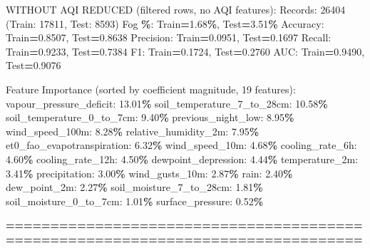\documentclass[
  letterpaper,
  DIV=11,
  numbers=noendperiod]{scrartcl}
\newenvironment{Shaded}{\begin{snugshade}}{\end{snugshade}}
\newcommand{\BuiltInTok}[1]{#1}
\newcommand{\DecValTok}[1]{\textcolor[rgb]{0.00,0.00,0.81}{#1}}
\newcommand{\FloatTok}[1]{\textcolor[rgb]{0.00,0.00,0.81}{#1}}
\newcommand{\NormalTok}[1]{#1}
\newcommand{\OperatorTok}[1]{\textcolor[rgb]{0.81,0.36,0.00}{\textbf{#1}}}
\begin{document}
\begin{Shaded}
\begin{Highlighting}[]
\NormalTok{WITHOUT AQI REDUCED (filtered rows, no AQI features):}
\NormalTok{  Records: }\DecValTok{26404}\NormalTok{ (Train: }\DecValTok{17811}\NormalTok{, Test: }\DecValTok{8593}\NormalTok{)}
\NormalTok{  Fog }\OperatorTok{\%}\NormalTok{: Train}\OperatorTok{=}\FloatTok{1.68}\OperatorTok{\%}\NormalTok{, Test}\OperatorTok{=}\FloatTok{3.51}\OperatorTok{\%}
\NormalTok{  Accuracy: Train}\OperatorTok{=}\FloatTok{0.8507}\NormalTok{, Test}\OperatorTok{=}\FloatTok{0.8638}
\NormalTok{  Precision: Train}\OperatorTok{=}\FloatTok{0.0951}\NormalTok{, Test}\OperatorTok{=}\FloatTok{0.1697}
\NormalTok{  Recall: Train}\OperatorTok{=}\FloatTok{0.9233}\NormalTok{, Test}\OperatorTok{=}\FloatTok{0.7384}
\NormalTok{  F1: Train}\OperatorTok{=}\FloatTok{0.1724}\NormalTok{, Test}\OperatorTok{=}\FloatTok{0.2760}
\NormalTok{  AUC: Train}\OperatorTok{=}\FloatTok{0.9490}\NormalTok{, Test}\OperatorTok{=}\FloatTok{0.9076}

\NormalTok{  Feature Importance (}\BuiltInTok{sorted}\NormalTok{ by coefficient magnitude, }\DecValTok{19}\NormalTok{ features):}
\NormalTok{    vapour\_pressure\_deficit: }\FloatTok{13.01}\OperatorTok{\%}
\NormalTok{    soil\_temperature\_7\_to\_28cm: }\FloatTok{10.58}\OperatorTok{\%}
\NormalTok{    soil\_temperature\_0\_to\_7cm: }\FloatTok{9.40}\OperatorTok{\%}
\NormalTok{    previous\_night\_low: }\FloatTok{8.95}\OperatorTok{\%}
\NormalTok{    wind\_speed\_100m: }\FloatTok{8.28}\OperatorTok{\%}
\NormalTok{    relative\_humidity\_2m: }\FloatTok{7.95}\OperatorTok{\%}
\NormalTok{    et0\_fao\_evapotranspiration: }\FloatTok{6.32}\OperatorTok{\%}
\NormalTok{    wind\_speed\_10m: }\FloatTok{4.68}\OperatorTok{\%}
\NormalTok{    cooling\_rate\_6h: }\FloatTok{4.60}\OperatorTok{\%}
\NormalTok{    cooling\_rate\_12h: }\FloatTok{4.50}\OperatorTok{\%}
\NormalTok{    dewpoint\_depression: }\FloatTok{4.44}\OperatorTok{\%}
\NormalTok{    temperature\_2m: }\FloatTok{3.41}\OperatorTok{\%}
\NormalTok{    precipitation: }\FloatTok{3.00}\OperatorTok{\%}
\NormalTok{    wind\_gusts\_10m: }\FloatTok{2.87}\OperatorTok{\%}
\NormalTok{    rain: }\FloatTok{2.40}\OperatorTok{\%}
\NormalTok{    dew\_point\_2m: }\FloatTok{2.27}\OperatorTok{\%}
\NormalTok{    soil\_moisture\_7\_to\_28cm: }\FloatTok{1.81}\OperatorTok{\%}
\NormalTok{    soil\_moisture\_0\_to\_7cm: }\FloatTok{1.01}\OperatorTok{\%}
\NormalTok{    surface\_pressure: }\FloatTok{0.52}\OperatorTok{\%}

\OperatorTok{================================================================================}


\end{Highlighting}
\end{Shaded}
\end{document}
